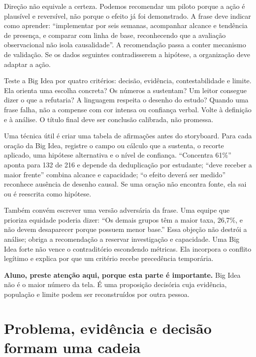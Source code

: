 Direção não equivale a certeza. Podemos recomendar um piloto porque a ação é plausível e reversível, não porque o efeito já foi demonstrado. A frase deve indicar como aprender: ``implementar por seis semanas, acompanhar alcance e tendência de presença, e comparar com linha de base, reconhecendo que a avaliação observacional não isola causalidade''. A recomendação passa a conter mecanismo de validação. Se os dados seguintes contradisserem a hipótese, a organização deve adaptar a ação.

Teste a Big Idea por quatro critérios: decisão, evidência, contestabilidade e limite. Ela orienta uma escolha concreta? Os números a sustentam? Um leitor consegue dizer o que a refutaria? A linguagem respeita o desenho do estudo? Quando uma frase falha, não a compense com cor intensa ou confiança verbal. Volte à definição e à análise. O título final deve ser conclusão calibrada, não promessa.

Uma técnica útil é criar uma tabela de afirmações antes do storyboard. Para cada oração da Big Idea, registre o campo ou cálculo que a sustenta, o recorte aplicado, uma hipótese alternativa e o nível de confiança. ``Concentra 61\%'' aponta para 132 de 216 e depende da deduplicação por estudante; ``deve receber a maior frente'' combina alcance e capacidade; ``o efeito deverá ser medido'' reconhece ausência de desenho causal. Se uma oração não encontra fonte, ela sai ou é reescrita como hipótese.

Também convém escrever uma versão adversária da frase. Uma equipe que prioriza equidade poderia dizer: ``Os demais grupos têm a maior taxa, 26,7\%, e não devem desaparecer porque possuem menor base.'' Essa objeção não destrói a análise; obriga a recomendação a reservar investigação e capacidade. Uma Big Idea forte não vence o contraditório escondendo métricas. Ela incorpora o conflito legítimo e explica por que um critério recebe precedência temporária.

\begin{GuidedBox}
\textbf{Aluno, preste atenção aqui, porque esta parte é importante.} Big Idea não é o maior número da tela. É uma proposição decisória cuja evidência, população e limite podem ser reconstruídos por outra pessoa.
\end{GuidedBox}

\section{Problema, evidência e decisão formam uma cadeia}

